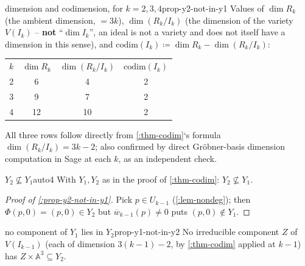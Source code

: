 \documentclass[a4paper,11pt]{scrartcl}
\begin{document}
\begin{example}{dimension and codimension, for \(k = 2,3,4\)}{prop-y2-not-in-y1} Values of \(\dim R_{k}\) (the ambient dimension, \(= 3k\)), \(\dim(R_{k}/I_{k})\) (the dimension of the variety \(V\left( I_{k} \right)\) -- \textbf{not} ``\(\dim I_{k}\)'', an ideal is not a variety and does not itself have a dimension in this sense), and \(\text{codim}\left( I_{k} \right) ≔ \dim R_{k} - \dim(R_{k}/I_{k})\):

\begin{longtable}[]{@{}cccc@{}}
\toprule\noalign{}
\endhead
\bottomrule\noalign{}
\endlastfoot
\(k\) & \(\dim R_{k}\) & \(\dim(R_{k}/I_{k})\) & \(\text{codim}\left( I_{k} \right)\) \\
2 & 6 & 4 & 2 \\
3 & 9 & 7 & 2 \\
4 & 12 & 10 & 2 \\
\end{longtable}

All three rows follow directly from \cref{:thm-codim}`s formula \(\dim(R_{k}/I_{k}) = 3k - 2\); also confirmed by direct Gröbner-basis dimension computation in Sage at each \(k\), as an independent check.

\end{example}

\begin{proposition}{{}\(Y_{2} \nsubseteq Y_{1}\)}{auto4} With \(Y_{1},Y_{2}\) as in the proof of \cref{:thm-codim}: \(Y_{2} \nsubseteq Y_{1}\).

\end{proposition} \protect{}\label{prop-y2-not-in-y1}{}

\begin{proof}[Proof of \cref{:prop-y2-not-in-y1}] Pick \(p \in U_{k - 1}\) (\cref{:lem-nondeg}); then \(\Phi(p,0) = (p,0) \in Y_{2}\) but \({\overline{w}}_{k - 1}(p) \neq 0\) puts \((p,0) \notin Y_{1}\).

\end{proof}

\begin{proposition}{no component of \(Y_{1}\) lies in \(Y_{2}\)}{prop-y1-not-in-y2} No irreducible component \(Z\) of \(V\left( I_{k - 1} \right)\) (each of dimension \(3(k - 1) - 2\), by \cref{:thm-codim} applied at \(k - 1\)) has \(Z \times \mathbb{A}^{3} \subseteq Y_{2}\).

\end{proposition} \protect{}\label{prop-y1-not-in-y2}{}
\end{document}
